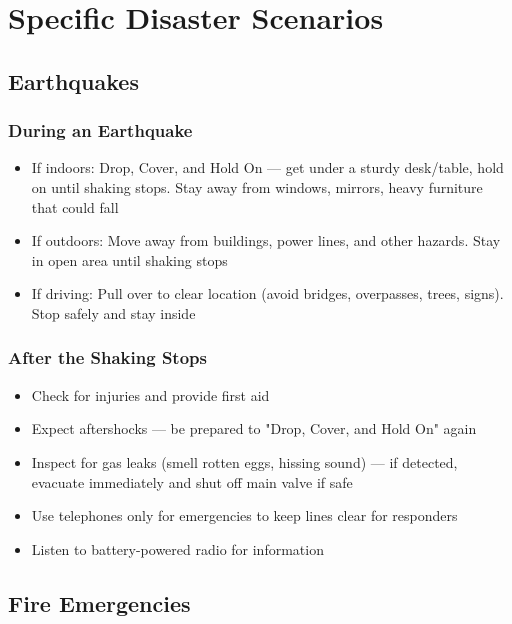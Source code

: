 \section{Specific Disaster Scenarios}

\subsection{Earthquakes}

\subsubsection{During an Earthquake}

\begin{itemize}
  \item If indoors: Drop, Cover, and Hold On — get under a sturdy desk/table, hold on until shaking stops. Stay away from windows, mirrors, heavy furniture that could fall
  \item If outdoors: Move away from buildings, power lines, and other hazards. Stay in open area until shaking stops
  \item If driving: Pull over to clear location (avoid bridges, overpasses, trees, signs). Stop safely and stay inside
\end{itemize}

\subsubsection{After the Shaking Stops}

\begin{itemize}
  \item Check for injuries and provide first aid
  \item Expect aftershocks — be prepared to "Drop, Cover, and Hold On" again
  \item Inspect for gas leaks (smell rotten eggs, hissing sound) — if detected, evacuate immediately and shut off main valve if safe
  \item Use telephones only for emergencies to keep lines clear for responders
  \item Listen to battery-powered radio for information
\end{itemize}

\subsection{Fire Emergencies}

